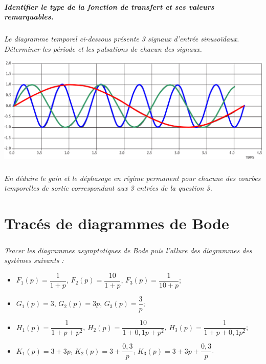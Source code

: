 \documentclass[10pt,fleqn]{article} %
\begin{document}
\begin{multicols}{2}
\begin{corrige}
\end{corrige}
\else
\fi


\subparagraph{Identifier le type de la fonction de transfert et ses valeurs remarquables.}
\textit{}
\ifprof
\begin{corrige}

\end{corrige}
\else
\fi


\subparagraph{}
\textit{Le diagramme temporel ci-dessous présente 3 signaux d'entrée sinusoïdaux. Déterminer les période et les pulsations de chacun des signaux. }


\begin{center}
\includegraphics[width=\linewidth]{images/img_02}
\end{center}


\ifprof
\begin{corrige}

\end{corrige}
\else
\fi


\subparagraph{}
\textit{En déduire le gain et le déphasage en régime permanent pour chacune des courbes temporelles de sortie correspondant aux 3 entrées de la question 3. }
\ifprof
\begin{corrige}

\end{corrige}
\else
\fi



\setcounter{exo}{0}
\section*{Tracés de diagrammes de Bode}

\subparagraph*{}
\textit{Tracer les diagrammes asymptotiques de Bode puis l'allure des diagrammes des systèmes suivants : }

\begin{itemize}
\item $F_1(p) = \dfrac{1}{1+p}$, $F_2(p) = \dfrac{10}{1+p}$, $F_3(p) = \dfrac{1}{10+p}$; 
\item $G_1(p) = 3$, $G_2(p) = 3p$, $G_3(p) = \dfrac{3}{p}$;
\item $H_1(p)=\dfrac{1}{1+p+p^2}$, $H_2(p)=\dfrac{10}{1+0,1p+p^2}$, $H_3(p)=\dfrac{1}{1+p+0,1p^2}$;
\item $K_1(p)=3+3p$, $K_2(p)=3+\dfrac{0,3}{p}$, $K_3(p)=3+3p+\dfrac{0,3}{p}$.
\end{itemize}
\ifprof
\begin{corrige}


\end{corrige}
\end{multicols}
\end{document}

